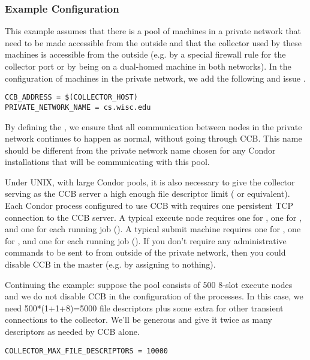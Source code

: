 \subsubsection{Example Configuration}

This example assumes that there is a pool of machines in a private
network that need to be made accessible from the outside and that the
collector used by these machines is accessible from the outside
(e.g. by a special firewall rule for the collector port or by being on
a dual-homed machine in both networks).  In the configuration of
machines in the private network, we add the following and issue
.

\begin{verbatim}
CCB_ADDRESS = $(COLLECTOR_HOST)
PRIVATE_NETWORK_NAME = cs.wisc.edu
\end{verbatim}

By defining the , we ensure that all
communication between nodes in the private network continues to happen
as normal, without going through CCB.  This name should be different
from the private network name chosen for any Condor installations that
will be communicating with this pool.

Under UNIX, with large Condor pools, it is also necessary to give the
collector serving as the CCB server a high enough file descriptor
limit ( or equivalent).  Each Condor
process configured to use CCB with  requires one
persistent TCP connection to the CCB server.  A typical execute node
requires one for , one for , and one for
each running job ().  A typical submit machine
requires one for , one for , and one for
each running job ().  If you don't require any
administrative commands to be sent to  from outside of
the private network, then you could disable CCB in the master
(e.g. by assigning  to nothing).

Continuing the example: suppose the pool consists of 500 8-slot
execute nodes and we do not disable CCB in the configuration of the
 processes.  In this case, we need 500*(1+1+8)=5000
file descriptors plus some extra for other transient connections to
the collector.  We'll be generous and give it twice as many
descriptors as needed by CCB alone.

\begin{verbatim}
COLLECTOR_MAX_FILE_DESCRIPTORS = 10000
\end{verbatim}

